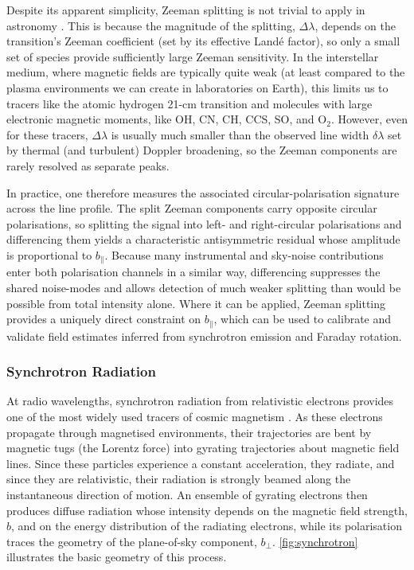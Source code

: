 Despite its apparent simplicity, Zeeman splitting is not trivial to apply in astronomy \citep[see details by \eg][]{brauer2017magnetic}. This is because the magnitude of the splitting, $\Delta \lambda$, depends on the transition's Zeeman coefficient (set by its effective Land\'e factor), so only a small set of species provide sufficiently large Zeeman sensitivity. In the interstellar medium, where magnetic fields are typically quite weak (at least compared to the plasma environments we can create in laboratories on Earth), this limits us to tracers like the atomic hydrogen 21-cm transition and molecules with large electronic magnetic moments, like OH, CN, CH, CCS, SO, and O$_2$. However, even for these tracers, $\Delta \lambda$ is usually much smaller than the observed line width $\delta \lambda$ set by thermal (and turbulent) Doppler broadening, so the Zeeman components are rarely resolved as separate peaks.

In practice, one therefore measures the associated circular-polarisation signature across the line profile. The split Zeeman components carry opposite circular polarisations, so splitting the signal into left- and right-circular polarisations and differencing them yields a characteristic antisymmetric residual whose amplitude is proportional to $b_\parallel$. Because many instrumental and sky-noise contributions enter both polarisation channels in a similar way, differencing suppresses the shared noise-modes and allows detection of much weaker splitting than would be possible from total intensity alone. Where it can be applied, Zeeman splitting provides a uniquely direct constraint on $b_\parallel$, which can be used to calibrate and validate field estimates inferred from synchrotron emission and Faraday rotation.

\subsubsection{Synchrotron Radiation}
\label{sec:how-we-see:synchrotron}

At radio wavelengths, synchrotron radiation from relativistic electrons provides one of the most widely used tracers of cosmic magnetism \citep{vallee2011magnetic}. As these electrons propagate through magnetised environments, their trajectories are bent by magnetic tugs (the Lorentz force) into gyrating trajectories about magnetic field lines. Since these particles experience a constant acceleration, they radiate, and since they are relativistic, their radiation is strongly beamed along the instantaneous direction of motion. An ensemble of gyrating electrons then produces diffuse radiation whose intensity depends on the magnetic field strength, $b$, and on the energy distribution of the radiating electrons, while its polarisation traces the geometry of the plane-of-sky component, $b_\perp$. \autoref{fig:synchrotron} illustrates the basic geometry of this process.

